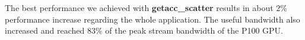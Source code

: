 The best performance we achieved with \textbf{getacc\_scatter} results in  about
$2\%$ performance increase regarding the whole application. The useful bandwidth
also increased and reached $83\%$ of the peak stream bandwidth of the P100 GPU.



